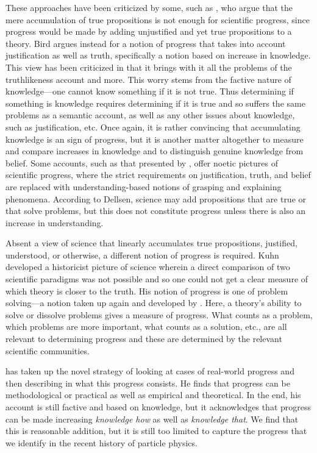 These approaches have been criticized by some, such as \citet{Bird2007}, who argue that the mere accumulation of true propositions is not enough for scientific progress, since progress would be made by adding unjustified and yet true propositions to a theory. 
Bird argues instead for a notion of progress that takes into account justification as well as truth, specifically a notion based on increase in knowledge. 
This view has been criticized in that it brings with it all the problems of the truthlikeness account and more. 
This worry stems from the factive nature of knowledge---one cannot know something if it is not true. 
Thus determining if something is knowledge requires determining if it is true and so suffers the same problems as a semantic account, as well as any other issues about knowledge, such as justification, etc. 
Once again, it is rather convincing that accumulating knowledge is an sign of progress, but it is another matter altogether to measure and compare increases in knowledge and to distinguish genuine knowledge from belief.
Some accounts, such as that presented by \citet{Dellsen2016-DELSPK}, offer noetic pictures of scientific progress, where the strict requirements on justification, truth, and belief are replaced with understanding-based notions of grasping and explaining phenomena. 
According to Dellsen, science may add propositions that are true or that solve problems, but this does not constitute progress unless there is also an increase in understanding. 

Absent a view of science that linearly accumulates true propositions, justified, understood, or otherwise, a different notion of progress is required. 
Kuhn developed a historicist picture of science wherein a direct comparison of two scientific paradigms was not possible and so one could not get a clear measure of which theory is closer to the truth. 
His notion of progress is one of problem solving---a notion taken up again and developed by \citet{Laudan1981}. 
Here, a theory's ability to solve or dissolve problems gives a measure of progress.
What counts as a problem, which problems are more important, what counts as a solution, etc., are all relevant to determining progress and these are determined by the relevant scientific communities.

\citet{Mizrahi2013-MIZWIS} has taken up the novel strategy of looking at cases of real-world progress and then describing in what this progress consists.
He finds that progress can be methodological or practical as well as empirical and theoretical. 
In the end, his account is still factive and based on knowledge, but it acknowledges that progress can be made increasing \textit{knowledge how} as well as \textit{knowledge that}. 
We find that this is reasonable addition, but it is still too limited to capture the progress that we identify in the recent history of particle physics. 

